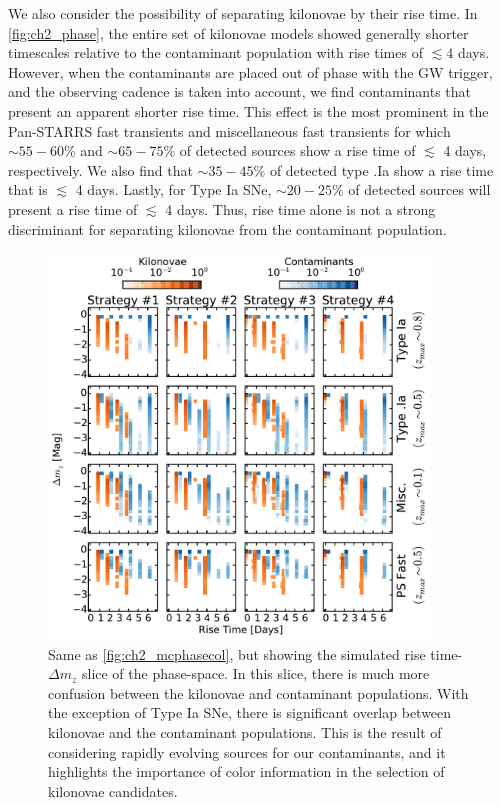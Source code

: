 We also consider the possibility of separating kilonovae by their rise time. In \autoref{fig:ch2_phase}, the entire set of kilonovae models showed generally shorter timescales relative to the contaminant population with rise times of $\lesssim4$ days. However, when the contaminants are placed out of phase with the GW trigger, and the observing cadence is taken into account, we find contaminants that present an apparent shorter rise time. This effect is the most prominent in the Pan-STARRS fast transients and miscellaneous fast transients for which $\sim55-60\%$ and $\sim65-75\%$ of detected sources show a rise time of $\lesssim$ 4 days, respectively. We also find that $\sim 35-45\%$ of detected type .Ia show a rise time that is $\lesssim$ 4 days. Lastly, for Type Ia SNe, $\sim20-25\%$ of detected sources will present a rise time of $\lesssim$ 4 days. Thus, rise time alone is not a strong discriminant for separating kilonovae from the contaminant population.

\begin{figure}[t!]
\centering
\includegraphics[width=0.9\textwidth]{./figs/chapter2/ch2_f9.pdf}
\caption{Same as \autoref{fig:ch2_mcphasecol}, but showing the simulated rise time-$\Delta m_z$ slice of the phase-space. In this slice, there is much more confusion between the kilonovae and contaminant populations. With the exception of Type Ia SNe, there is significant overlap between kilonovae and the contaminant populations. This is the result of considering rapidly evolving sources for our contaminants, and it highlights the importance of color information in the selection of kilonovae candidates.}
\label{fig:ch2_mcphasedm}
\end{figure}

